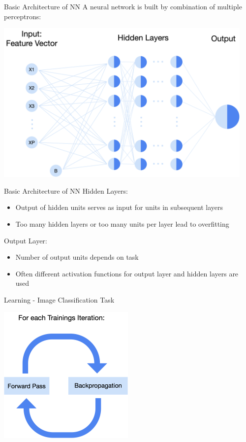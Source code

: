 \documentclass[11pt,compress,t,notes=noshow, xcolor=table]{beamer}
\begin{document}
\begin{vbframe}{Basic Architecture of NN}
\small A neural network is built by combination of multiple perceptrons:

\vspace{0.5cm}

\includegraphics[width = 0.95\textwidth]{slides/neural-networks/figure_man/nutshell-nn-basic-architecture.png}    
\end{vbframe}

\begin{vbframe}{Basic Architecture of NN}
Hidden Layers: 
     \begin{itemize}
         \item  Output of hidden units serves as input for units in subsequent layers
         \item Too many hidden layers or too many units per layer lead to overfitting
     \end{itemize}
Output Layer:
    \begin{itemize}
        \item Number of output units depends on task
        \item Often different activation functions for output layer and hidden layers are used
    \end{itemize}

\end{vbframe}

\begin{vbframe}{Learning - Image Classification Task}
\vspace{0.5cm}
\begin{center}
    \includegraphics[width = 0.5\textwidth]{slides/neural-networks/figure_man/nutshell-nn-iteration.png}   
\end{center}

\end{vbframe}
\end{document}
